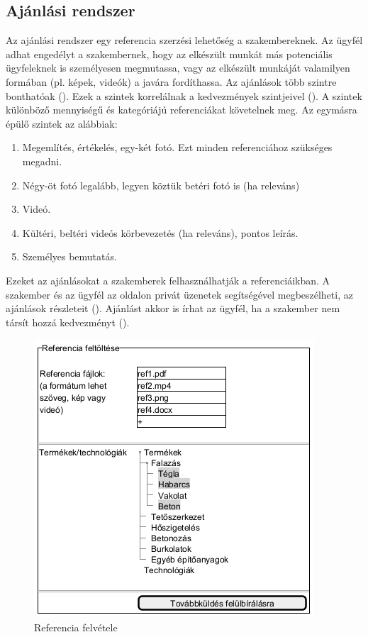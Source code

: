 \subsection{Ajánlási rendszer}
Az ajánlási rendszer egy referencia szerzési lehetőség a szakembereknek. Az ügyfél adhat engedélyt a szakembernek, hogy az elkészült munkát más potenciális ügyfeleknek is személyesen megmutassa, vagy az elkészült munkáját valamilyen formában (pl. képek, videók) a javára fordíthassa. Az ajánlások több szintre bonthatóak (). Ezek a szintek korrelálnak a kedvezmények szintjeivel (). A szintek különböző mennyiségű és kategóriájú referenciákat követelnek meg. Az egymásra épülő szintek az alábbiak:
\begin{enumerate}
  \item Megemlítés, értékelés, egy-két fotó. Ezt minden referenciához szükséges megadni.
  \item Négy-öt fotó legalább, legyen köztük betéri fotó is (ha releváns)
  \item Videó.
  \item Kültéri, beltéri videós körbevezetés (ha releváns), pontos leírás.
  \item Személyes bemutatás.
\end{enumerate}
Ezeket az ajánlásokat a szakemberek felhasználhatják a referenciáikban. A szakember és az ügyfél az oldalon privát üzenetek segítségével megbeszélheti, az ajánlások részleteit (). Ajánlást akkor is írhat az ügyfél, ha a szakember nem társít hozzá kedvezményt ().

\begin{figure}[h]
	\centering
	\includegraphics[scale=0.5]{img/referenciak.png}
	\caption{Referencia felvétele}
	\label{fig:ref}
\end{figure}